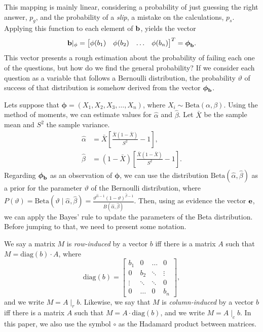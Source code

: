 \documentclass{article}
\newcommand{\0}{\mathbbold{0}}
\newcommand{\1}{\mathds{1}}
\newcommand{\diag}[1]{\text{diag}\!\left(#1\right)}
\newcommand{\Beta}[2]{\text{Beta}\!\left(#1,#2\right)}
\begin{document}
This mapping is mainly linear, considering a probability of just guessing the right answer, $p_g$, and the probability of a \textsl{slip}, a mistake on the calculations, $p_s$.
Applying this function to each element of ${\bf b}$, yields the vector
$$ {\bf b}|_\phi = \begin{bmatrix}
    \phi(b_1) & \phi(b_2) & \hdots & \phi(b_n)
\end{bmatrix}^T = {\boldsymbol \phi}_{\bf b}. $$
This vector presents a rough estimation about the probability of failing each one of the questions, but how do we find the general probability?
If we consider each question as a variable that follows a Bernoulli distribution, the probability $\vartheta$ of success of that distribution is somehow derived from the vector ${\boldsymbol \phi}_{\bf b}$.

Lets suppose that ${\boldsymbol \phi} = \left(X_1, X_2, X_3, \dots, X_n\right)$, where $X_i \sim \Beta{\alpha}{\beta}$. Using the method of moments, we can estimate values for $\hat{\alpha}$ and $\hat{\beta}$.
Let $\bar{X}$ be the sample mean and $S^2$ the sample variance.
\begin{align*}
    \hat{\alpha} &= \bar{X}\left[\frac{\bar{X}(1-\bar{X})}{S^2} - 1\right], \\
    \hat{\beta} &= (1 - \bar{X})\left[\frac{\bar{X}(1-\bar{X})}{S^2} - 1\right].
\end{align*}
Regarding ${\boldsymbol \phi}_{\bf b}$ as an observation of ${\boldsymbol \phi}$, we can use the distribution $\Beta{\hat{\alpha}}{\hat{\beta}}$ as a prior for the parameter $\vartheta$ of the Bernoulli distribution,
where $P(\vartheta) = \Beta{\vartheta \mid \hat{\alpha}}{\hat{\beta}} = \frac{\vartheta^{\hat{\alpha} - 1}(1 - \vartheta)^{\hat{\beta} - 1}}{B\left(\hat{\alpha},\hat{\beta}\right)}$.
Then, using as evidence the vector ${\bf e}$, we can apply the Bayes' rule to update the parameters of the Beta distribution.
Before jumping to that, we need to present some notation.

We say a matrix $M$ is \textsl{row-induced} by a vector $b$ iff there is a matrix $A$ such that $M = \diag{b}\cdot A$, where
$$ \diag{b} = \begin{bmatrix}
    b_1 & 0 & \hdots & 0 \\
    0 & b_2 & \ddots & \vdots \\
    \vdots & \ddots & \ddots & 0 \\
    0 & \hdots & 0 & b_n
\end{bmatrix}, $$ and we write $M = A \mid_r b$.
Likewise, we say that $M$ is \textsl{column-induced} by a vector $b$ iff there is a matrix $A$ such that $M = A\cdot\diag{b}$, and we write $M = A \mid_c b$.
In this paper, we also use the symbol $\circ$ as the Hadamard product between matrices.
\end{document}
